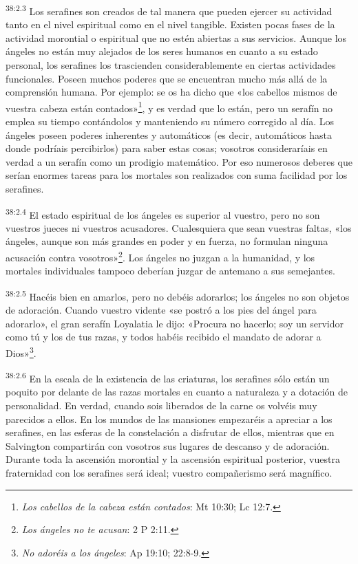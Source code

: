 \par
\textsuperscript{38:2.3} Los serafines son creados de tal manera que pueden ejercer su actividad tanto en el nivel espiritual como en el nivel tangible. Existen pocas fases de la actividad morontial o espiritual que no estén abiertas a sus servicios. Aunque los ángeles no están muy alejados de los seres humanos en cuanto a su estado personal, los serafines los trascienden considerablemente en ciertas actividades funcionales. Poseen muchos poderes que se encuentran mucho más allá de la comprensión humana. Por ejemplo: se os ha dicho que «los cabellos mismos de vuestra cabeza están contados»\footnote{\textit{Los cabellos de la cabeza están contados}: Mt 10:30; Lc 12:7.}, y es verdad que lo están, pero un serafín no emplea su tiempo contándolos y manteniendo su número corregido al día. Los ángeles poseen poderes inherentes y automáticos (es decir, automáticos hasta donde podríais percibirlos) para saber estas cosas; vosotros consideraríais en verdad a un serafín como un prodigio matemático. Por eso numerosos deberes que serían enormes tareas para los mortales son realizados con suma facilidad por los serafines.

\par
\textsuperscript{38:2.4} El estado espiritual de los ángeles es superior al vuestro, pero no son vuestros jueces ni vuestros acusadores. Cualesquiera que sean vuestras faltas, «los ángeles, aunque son más grandes en poder y en fuerza, no formulan ninguna acusación contra vosotros»\footnote{\textit{Los ángeles no te acusan}: 2 P 2:11.}. Los ángeles no juzgan a la humanidad, y los mortales individuales tampoco deberían juzgar de antemano a sus semejantes.

\par
\textsuperscript{38:2.5} Hacéis bien en amarlos, pero no debéis adorarlos; los ángeles no son objetos de adoración. Cuando vuestro vidente «se postró a los pies del ángel para adorarlo», el gran serafín Loyalatia le dijo: «Procura no hacerlo; soy un servidor como tú y los de tus razas, y todos habéis recibido el mandato de adorar a Dios»\footnote{\textit{No adoréis a los ángeles}: Ap 19:10; 22:8-9.}.

\par
\textsuperscript{38:2.6} En la escala de la existencia de las criaturas, los serafines sólo están un poquito por delante de las razas mortales en cuanto a naturaleza y a dotación de personalidad. En verdad, cuando sois liberados de la carne os volvéis muy parecidos a ellos. En los mundos de las mansiones empezaréis a apreciar a los serafines, en las esferas de la constelación a disfrutar de ellos, mientras que en Salvington compartirán con vosotros sus lugares de descanso y de adoración. Durante toda la ascensión morontial y la ascensión espiritual posterior, vuestra fraternidad con los serafines será ideal; vuestro compañerismo será magnífico.

